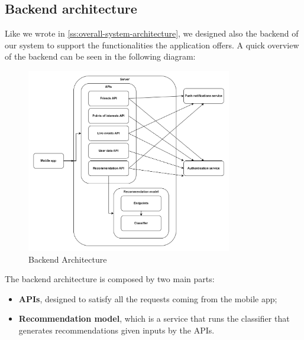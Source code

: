 \documentclass[../../main]{subfiles}
\begin{document}
\label{ss:backend-architecture}
\subsection{Backend architecture}
Like we wrote in \ref{ss:overall-system-architecture}, we designed also the backend of our system to support the functionalities the application offers.
A quick overview of the backend can be seen in the following diagram:
\begin{figure}[h]
    \centering
    \includegraphics[width=0.8\textwidth]{images/backend_architecture}
    \caption{Backend Architecture}\label{img:backend_architecture}
\end{figure}
The backend architecture is composed by two main parts:
\begin{itemize}
    \item \textbf{APIs}, designed to satisfy all the requests coming from the mobile app;
    \item \textbf{Recommendation model}, which is a service that runs the classifier that generates recommendations given inputs by the APIs.
\end{itemize}

\label{sss:apis}
\end{document}
